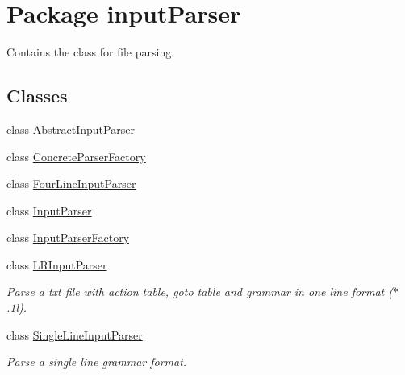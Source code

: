 \hypertarget{namespaceinput_parser}{\section{Package input\-Parser}
\label{namespaceinput_parser}
}


Contains the class for file parsing.  


\subsection*{Classes}
\begin{DoxyCompactItemize}
\item 
class \hyperlink{classinput_parser_1_1_abstract_input_parser}{Abstract\-Input\-Parser}
\item 
class \hyperlink{classinput_parser_1_1_concrete_parser_factory}{Concrete\-Parser\-Factory}
\item 
class \hyperlink{classinput_parser_1_1_four_line_input_parser}{Four\-Line\-Input\-Parser}
\item 
class \hyperlink{classinput_parser_1_1_input_parser}{Input\-Parser}
\item 
class \hyperlink{classinput_parser_1_1_input_parser_factory}{Input\-Parser\-Factory}
\item 
class \hyperlink{classinput_parser_1_1_l_r_input_parser}{L\-R\-Input\-Parser}
\begin{DoxyCompactList}\small\item\em Parse a txt file with action table, goto table and grammar in one line format ($\ast$.1l). \end{DoxyCompactList}\item 
class \hyperlink{classinput_parser_1_1_single_line_input_parser}{Single\-Line\-Input\-Parser}
\begin{DoxyCompactList}\small\item\em Parse a single line grammar format. \end{DoxyCompactList}\end{DoxyCompactItemize}


